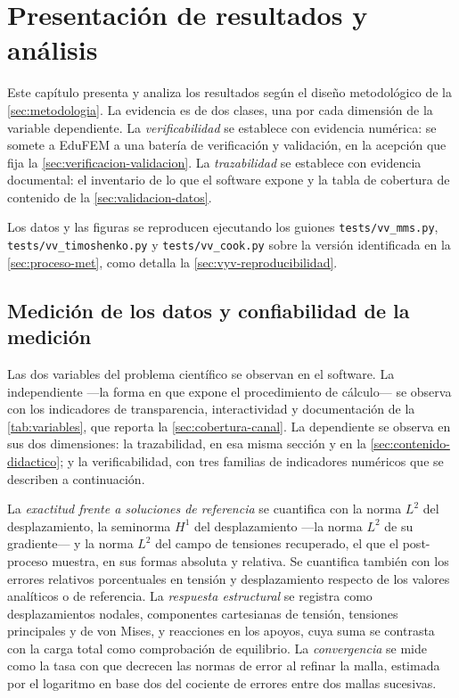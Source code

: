 \chapter{Presentación de resultados y análisis}
\label{cap:resultados}


Este capítulo presenta y analiza los resultados según el diseño metodológico de la \autoref{sec:metodologia}. La evidencia es de dos clases, una por cada dimensión de la variable dependiente. La \emph{verificabilidad} se establece con evidencia numérica: se somete a EduFEM a una batería de verificación y validación, en la acepción que fija la \autoref{sec:verificacion-validacion}. La \emph{trazabilidad} se establece con evidencia documental: el inventario de lo que el software expone y la tabla de cobertura de contenido de la \autoref{sec:validacion-datos}.

Los datos y las figuras se reproducen ejecutando los guiones \texttt{tests/vv\_mms.py}, \texttt{tests/vv\_timoshenko.py} y \texttt{tests/vv\_cook.py} sobre la versión identificada en la \autoref{sec:proceso-met}, como detalla la \autoref{sec:vyv-reproducibilidad}.

\section{Medición de los datos y confiabilidad de la medición}
\label{sec:medicion}

Las dos variables del problema científico se observan en el software. La independiente —la forma en que expone el procedimiento de cálculo— se observa con los indicadores de transparencia, interactividad y documentación de la \autoref{tab:variables}, que reporta la \autoref{sec:cobertura-canal}. La dependiente se observa en sus dos dimensiones: la trazabilidad, en esa misma sección y en la \autoref{sec:contenido-didactico}; y la verificabilidad, con tres familias de indicadores numéricos que se describen a continuación.

La \emph{exactitud frente a soluciones de referencia} se cuantifica con la norma $L^2$ del desplazamiento, la seminorma $H^1$ del desplazamiento ---la norma $L^2$ de su gradiente--- y la norma $L^2$ del campo de tensiones recuperado, el que el post-proceso muestra, en sus formas absoluta y relativa. Se cuantifica también con los errores relativos porcentuales en tensión y desplazamiento respecto de los valores analíticos o de referencia. La \emph{respuesta estructural} se registra como desplazamientos nodales, componentes cartesianas de tensión, tensiones principales y de von Mises, y reacciones en los apoyos, cuya suma se contrasta con la carga total como comprobación de equilibrio. La \emph{convergencia} se mide como la tasa con que decrecen las normas de error al refinar la malla, estimada por el logaritmo en base dos del cociente de errores entre dos mallas sucesivas.

